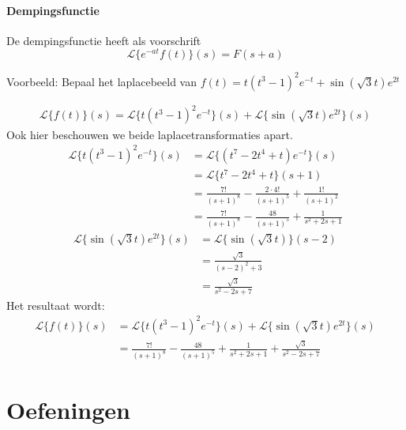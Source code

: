 \documentclass[12pt]{report}
\newcommand{\example}[2]{
      \hrulefill
      
      Voorbeeld: #1
      
      #2
      
      \hrulefill
}
\begin{document}
\subsection{Dempingsfunctie}
De dempingsfunctie heeft als voorschrift 
$$\mathcal{L}\{e^{-at}f(t)\}(s) = F(s + a)$$
\example{Bepaal het laplacebeeld van $f(t) = t(t^3 - 1)^2e^{-t} + \sin(\sqrt{3}t)e^{2t}$}
{
\begin{equation*}
 \begin{split}
  \mathcal{L}\{f(t)\}(s) = \mathcal{L}\{t(t^3 - 1)^2e^{-t}\}(s) + \mathcal{L}\{\sin(\sqrt{3}t)e^{2t}\}(s)
 \end{split}
\end{equation*}
Ook hier beschouwen we beide laplacetransformaties apart.
\begin{equation*}
 \begin{split}
  \mathcal{L}\{t(t^3 - 1)^2e^{-t}\}(s) & = \mathcal{L}\{(t^7 - 2t^4 + t)e^{-t}\}(s) \\
                                    & = \mathcal{L}\{t^7 - 2t^4 + t\}(s + 1) \\
                                    & = \frac{7!}{(s + 1)^8} - \frac{2 \cdot 4!}{(s + 1)^5} + \frac{1!}{(s + 1)^2} \\
                                    & = \frac{7!}{(s + 1)^8} - \frac{48}{(s + 1)^5} + \frac{1}{s^2 + 2s + 1}
 \end{split}
\end{equation*}
\begin{equation*}
 \begin{split}
  \mathcal{L}\{\sin(\sqrt{3}t)e^{2t}\}(s) & = \mathcal{L}\{\sin(\sqrt{3}t)\}(s - 2) \\
                                          & = \frac{\sqrt{3}}{(s - 2)^2 + 3} \\
                                          & = \frac{\sqrt{3}}{s^2 -2s + 7}
 \end{split}
\end{equation*}
Het resultaat wordt:
\begin{equation*}
 \begin{split}
  \mathcal{L}\{f(t)\}(s) & = \mathcal{L}\{t(t^3 - 1)^2e^{-t}\}(s) + \mathcal{L}\{\sin(\sqrt{3}t)e^{2t}\}(s) \\
                         & = \frac{7!}{(s + 1)^8} - \frac{48}{(s + 1)^5} + \frac{1}{s^2 + 2s + 1} + \frac{\sqrt{3}}{s^2 -2s + 7}
 \end{split}
\end{equation*}
}
\part{Oefeningen}
\end{document}
